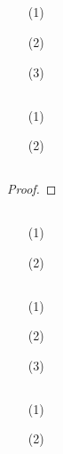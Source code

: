 \documentclass[UTF8]{ctexart}
\begin{document}
\subsection{}   %
\begin{enumerate}
    \item [(1)]
    \item [(2)]
    \item [(3)]
\end{enumerate}

\subsection{}   %
\begin{enumerate}
    \item [(1)]
    \item [(2)]
\end{enumerate}

\subsection{}   %
\begin{proof}
    
\end{proof}

\subsection{}   %
\begin{enumerate}
    \item [(1)]
    \item [(2)]
\end{enumerate}

\subsection{}   %
\begin{enumerate}
    \item [(1)]
    \item [(2)]
    \item [(3)]
\end{enumerate}

\subsection{}   %
\begin{enumerate}
    \item [(1)]
    \item [(2)]
\end{enumerate}
\end{document}
